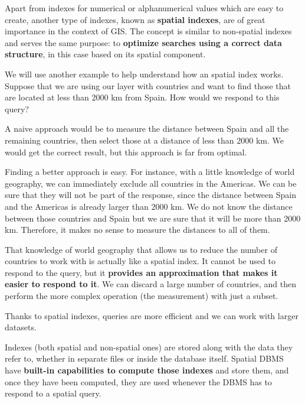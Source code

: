 Apart from indexes for numerical or alphanumerical values which are easy to create, another type of indexes, known as \textbf{spatial indexes}, are of great importance in the context of GIS. The concept is similar to non-spatial indexes and serves the same purpose: to \textbf{optimize searches using a correct data structure}, in this case based on its spatial component.

We will use another example to help understand how an spatial index works. Suppose that we are using our layer with countries and want to find those that are located at less than 2000 km from Spain. How would we respond to this query? 

A naive approach would be to measure the distance between Spain and all the remaining countries, then select those at a distance of less than 2000 km. We would get the correct result, but this approach is far from optimal. 

Finding a better approach is easy. For instance, with a little knowledge of world geography, we can immediately exclude all countries in the Americas. We can be sure that they will not be part of the response, since the distance between Spain and the Americas is already larger than 2000 km. We do not know the distance between those countries and Spain but we are sure that it will be more than 2000 km. Therefore, it makes no sense to measure the distances to all of them.

That knowledge of world geography that allows us to reduce the number of countries to work with is actually like a spatial index. It cannot be used to respond to the query, but it \textbf{provides an approximation that makes it easier to respond to it}. We can discard a large number of countries, and then perform the more complex operation (the measurement) with just a subset.

Thanks to spatial indexes, queries are more efficient and we can work with larger datasets.

Indexes (both spatial and non-spatial ones) are stored along with the data they refer to, whether in separate files or inside the database itself. Spatial DBMS have \textbf{built-in capabilities to compute those indexes} and store them, and once they have been computed, they are used whenever the DBMS has to respond to a spatial query.


\pagestyle{empty}
